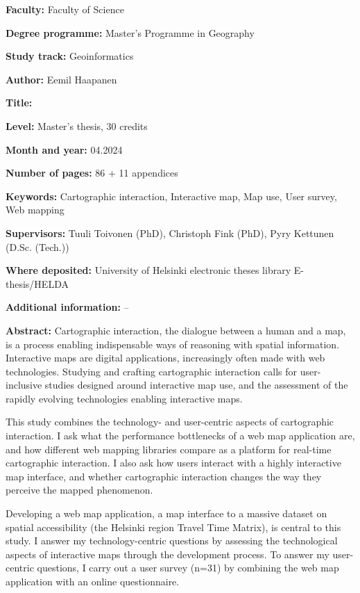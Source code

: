 \begin{spacing}{1}
\setlength{\parskip}{4pt}

\textbf{Faculty:} Faculty of Science

\textbf{Degree programme:} Master's Programme in Geography

\textbf{Study track:} Geoinformatics

\textbf{Author:} Eemil Haapanen

\textbf{Title:} \mytitle

\textbf{Level:} Master's thesis, 30 credits

\textbf{Month and year:} 04.2024  %

\textbf{Number of pages:} 86 + 11 appendices  %

\textbf{Keywords:} Cartographic interaction, Interactive map, Map use, User survey, Web mapping

\textbf{Supervisors:} Tuuli Toivonen (PhD), Christoph Fink (PhD), Pyry Kettunen (D.Sc. (Tech.))

\textbf{Where deposited:} University of Helsinki electronic theses library E-thesis/HELDA

\textbf{Additional information:} --

\textbf{Abstract:} Cartographic interaction, the dialogue between a human and a map, is
a process enabling indispensable ways of reasoning with spatial information.
Interactive maps are digital applications,
increasingly often made with web technologies.
Studying and crafting cartographic interaction calls for
user-inclusive studies designed around interactive map use,
and the assessment of the rapidly evolving technologies enabling interactive maps.

This study combines the technology- and user-centric aspects of cartographic interaction.
I ask what the performance bottlenecks of a web map application are,
and how different web mapping libraries compare as a platform for real-time cartographic interaction.
I also ask how users interact with a highly interactive map interface,
and whether cartographic interaction changes the way they perceive the mapped phenomenon.

Developing a web map application,
a map interface to a massive dataset on spatial accessibility (the Helsinki region Travel Time Matrix),
is central to this study.
I answer my technology-centric questions by assessing the technological aspects of interactive maps
through the development process.
To answer my user-centric questions,
I carry out a user survey (n=31) by combining the web map application with an online questionnaire.


\end{spacing}
